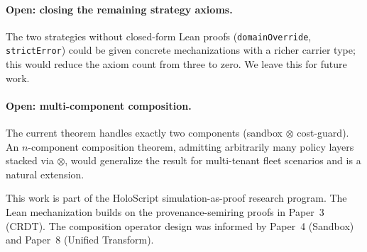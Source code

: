 \documentclass[sigconf]{acmart}
\newcommand{\compose}{\mathbin{\otimes}}
\begin{document}
\paragraph{Open: closing the remaining strategy axioms.}
The two strategies without closed-form Lean proofs
(\texttt{domainOverride}, \texttt{strictError}) could be given concrete
mechanizations with a richer carrier type; this would reduce the axiom count
from three to zero.  We leave this for future work.

\paragraph{Open: multi-component composition.}
The current theorem handles exactly two components (sandbox $\compose$
cost-guard).  An $n$-component composition theorem, admitting arbitrarily
many policy layers stacked via $\compose$, would generalize the result for
multi-tenant fleet scenarios and is a natural extension.

\begin{acks}
This work is part of the HoloScript simulation-as-proof research program.
The Lean mechanization builds on the provenance-semiring proofs in Paper~3
(CRDT).  The composition operator design was informed by Paper~4 (Sandbox)
and Paper~8 (Unified Transform).
\end{acks}



\end{document}

